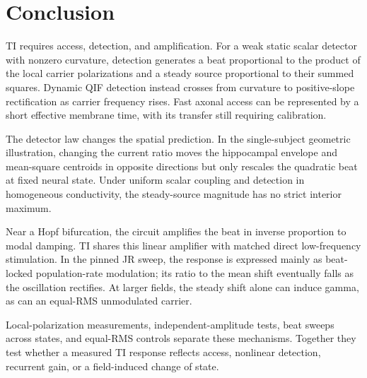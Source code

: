 \documentclass[11pt,a4paper]{article}
\begin{document}
\section{Conclusion}
TI requires access, detection, and amplification. For a weak static scalar
detector with nonzero curvature, detection generates a beat proportional
to the product of the local carrier polarizations and a steady source
proportional to their summed squares. Dynamic QIF detection instead crosses
from curvature to positive-slope rectification as carrier frequency rises.
Fast axonal access can be represented
by a short effective membrane time, with its transfer still requiring calibration.

The detector law changes the spatial prediction. In the single-subject
geometric illustration, changing the current ratio moves the hippocampal
envelope and mean-square centroids in opposite directions but only rescales the quadratic beat at fixed
neural state. Under uniform scalar coupling and detection in homogeneous conductivity, the
steady-source magnitude has no strict interior maximum.

Near a Hopf bifurcation, the circuit amplifies the beat in inverse proportion
to modal damping. TI shares this linear amplifier with matched direct
low-frequency stimulation. In the pinned JR sweep, the response is expressed
mainly as beat-locked population-rate modulation; its ratio to the mean shift eventually falls
as the oscillation rectifies. At larger fields, the steady shift alone can
induce gamma, as can an equal-RMS unmodulated carrier.

Local-polarization measurements, independent-amplitude tests, beat sweeps
across states, and equal-RMS controls separate these mechanisms.
Together they test whether a measured TI response reflects access,
nonlinear detection, recurrent gain, or a field-induced change of state.
\end{document}
